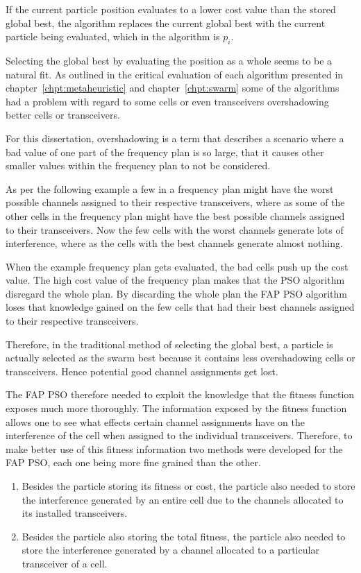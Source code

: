 If the current particle position evaluates to a lower cost value than the stored global best, the algorithm replaces the current global best with the current particle being evaluated, which in the algorithm is $p_i$.

Selecting the global best by evaluating the position as a whole seems to be a natural fit. As outlined in the critical evaluation of each algorithm presented in chapter~\ref{chpt:metaheuristic} and chapter~\ref{chpt:swarm} some of the algorithms had a problem with regard to some cells or even transceivers overshadowing better cells or transceivers.

For this dissertation, overshadowing is a term that describes a scenario where a bad value of one part of the frequency plan is so large, that it causes other smaller values within the frequency plan to not be considered. 

As per the following example a few in a frequency plan might have the worst possible channels assigned to their respective transceivers, where as some of the other cells in the frequency plan might have the best possible channels assigned to their transceivers. Now the few cells with the worst channels generate lots of interference, where as the cells with the best channels generate almost nothing.

When the example frequency plan gets evaluated, the bad cells push up the cost value. The high cost value of the frequency plan makes that the PSO algorithm disregard the whole plan. By discarding the whole plan the FAP PSO algorithm loses that knowledge gained on the few cells that had their best channels assigned to their respective transceivers.

Therefore, in the traditional method of selecting the global best, a particle is actually selected as the swarm best because it contains less overshadowing cells or transceivers. Hence potential good channel assignments get lost.

The FAP PSO therefore needed to exploit the knowledge that the fitness function exposes much more thoroughly. The information exposed by the fitness function allows one to see what effects certain channel assignments have on the interference of the cell when assigned to the individual transceivers. Therefore, to make better use of this fitness information two methods were developed for the FAP PSO, each one being more fine grained than the other.

\begin{enumerate}
\item Besides the particle storing its fitness or cost, the particle also needed to store the interference generated by an entire cell due to the channels allocated to its installed transceivers.
\item Besides the particle also storing the total fitness, the particle also needed to store the interference generated by a channel allocated to a particular transceiver of a cell.
\end{enumerate}

